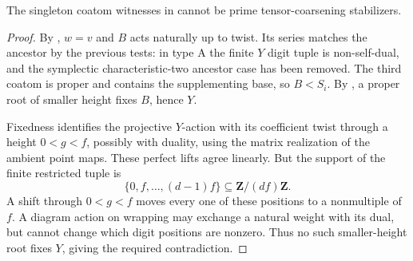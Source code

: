 \begin{proposition}
\label{fb:singleton-tensors}
The singleton coatom witnesses in  cannot be
prime tensor-coarsening stabilizers.
\end{proposition}
\begin{proof}

By , \(w=v\) and \(B\) acts naturally
up to twist. Its series matches the ancestor by the previous tests:
in type A the finite \(Y\) digit tuple is non-self-dual, and the
symplectic characteristic-two ancestor case has been removed.
The third coatom is proper and contains the supplementing base, so
\(B<S_i\). By , a proper root of smaller
height fixes \(B\), hence \(Y\).

Fixedness identifies the projective \(Y\)-action with its coefficient
twist through a height \(0<g<f\), possibly with duality, using the
matrix realization of the ambient point maps. These perfect lifts
agree linearly. But the support of the finite restricted tuple is
\[
 \{0,f,\ldots,(d-1)f\}\subseteq\mathbf Z/(df)\mathbf Z.
\]
A shift through \(0<g<f\) moves every one of these positions to a
nonmultiple of \(f\).  A diagram action on wrapping may exchange a natural
weight with its dual, but cannot change which digit positions are nonzero.
Thus no such smaller-height root fixes \(Y\), giving the required
contradiction.
\end{proof}

